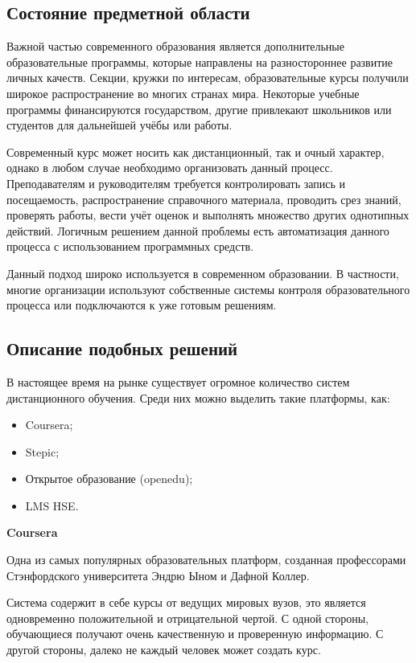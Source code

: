 \documentclass[a4paper,14pt]{article}
\begin{document}

\subsection{Состояние предметной области}

Важной частью современного образования является дополнительные образовательные программы, которые направлены на разностороннее развитие личных качеств.
Секции, кружки по интересам, образовательные курсы получили широкое распространение во многих странах мира.
Некоторые учебные программы финансируются государством, другие привлекают школьников или студентов для дальнейшей учёбы или работы.

Современный курс может носить как дистанционный, так и очный характер, однако в любом случае необходимо организовать данный процесс.
Преподавателям и руководителям требуется контролировать запись и посещаемость, распространение справочного материала, проводить срез знаний, проверять работы, вести учёт оценок и выполнять множество других однотипных действий.
Логичным решением данной проблемы есть автоматизация данного процесса с использованием программных средств.

Данный подход широко используется в современном образовании. В частности, многие организации используют собственные системы контроля образовательного процесса или подключаются к уже готовым решениям.

\subsection{Описание подобных решений}

В настоящее время на рынке существует огромное количество систем дистанционного обучения. Среди них можно выделить такие платформы, как:
\begin{itemize}
	\item Coursera;
	\item Stepic;
	\item Открытое образование (openedu);
	\item LMS HSE.
\end{itemize}

\textbf{Coursera}

Одна из самых популярных образовательных платформ, созданная профессорами Стэнфордского университета Эндрю Ыном и Дафной Коллер. 

Система содержит в себе курсы от ведущих мировых вузов, это является одновременно положительной и отрицательной чертой. С одной стороны, обучающиеся получают  очень качественную и проверенную информацию. С другой стороны, далеко не каждый человек может создать курс.
\end{document}
